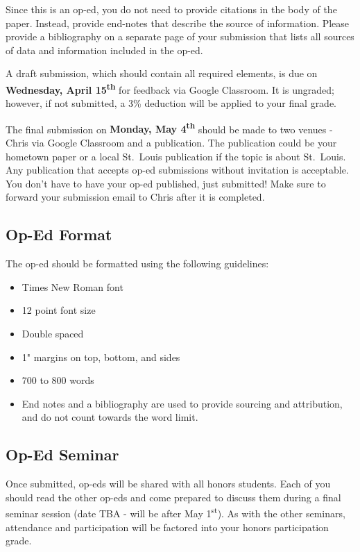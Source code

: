 \documentclass[]{book}
\providecommand{\tightlist}{%
  \setlength{\itemsep}{0pt}\setlength{\parskip}{0pt}}
\begin{document}
Since this is an op-ed, you do not need to provide citations in the body of the paper. Instead, provide end-notes that describe the source of information. Please provide a bibliography on a separate page of your submission that lists all sources of data and information included in the op-ed.

A draft submission, which should contain all required elements, is due on \textbf{Wednesday, April 15\textsuperscript{th}} for feedback via Google Classroom. It is ungraded; however, if not submitted, a 3\% deduction will be applied to your final grade.

The final submission on \textbf{Monday, May 4\textsuperscript{th}} should be made to two venues - Chris via Google Classroom and a publication. The publication could be your hometown paper or a local St.~Louis publication if the topic is about St.~Louis. Any publication that accepts op-ed submissions without invitation is acceptable. You don't have to have your op-ed published, just submitted! Make sure to forward your submission email to Chris after it is completed.

\hypertarget{op-ed-format}{%
\subsection{Op-Ed Format}\label{op-ed-format}}

The op-ed should be formatted using the following guidelines:

\begin{itemize}
\tightlist
\item
  Times New Roman font
\item
  12 point font size
\item
  Double spaced
\item
  1" margins on top, bottom, and sides
\item
  700 to 800 words
\item
  End notes and a bibliography are used to provide sourcing and attribution, and do not count towards the word limit.
\end{itemize}

\hypertarget{op-ed-seminar}{%
\subsection{Op-Ed Seminar}\label{op-ed-seminar}}

Once submitted, op-eds will be shared with all honors students. Each of you should read the other op-eds and come prepared to discuss them during a final seminar session (date TBA - will be after May 1\textsuperscript{st}). As with the other seminars, attendance and participation will be factored into your honors participation grade.
\end{document}
